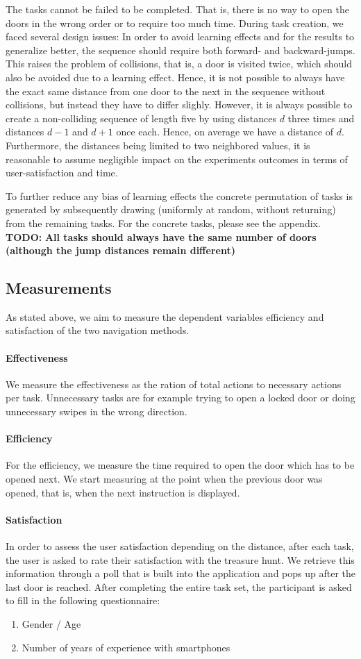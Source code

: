 \documentclass{sig-alternate-05-2015}
\newcommand{\todo}{\textbf{TODO:} \textbf}
\begin{document}
The tasks cannot be failed to be completed. That is, there is no way to open the doors in the wrong order or to require too much time.
During task creation, we faced several design issues: In order to avoid learning effects and for the results to generalize better, 
the sequence should require both forward- and backward-jumps. This raises the problem of collisions, that is, a door is visited twice, which
should also be avoided due to a learning effect. Hence, it is not possible to always have the exact same distance from one door to the
next in the sequence without collisions, but instead they have to differ slighly. However, it is always possible to create a non-colliding sequence of
length five by using distances $d$ three times and distances $d - 1$ and $d + 1$ once each. Hence, on average we have a distance of $d$. 
Furthermore, the distances being limited to two neighbored values, it is reasonable to assume negligible
impact on the experiments outcomes in terms of user-satisfaction and time.

To further reduce any bias of learning effects
the concrete permutation of tasks is generated by subsequently drawing
(uniformly at random, without returning) from the remaining tasks.
For the concrete tasks, please see the appendix.
\todo{All tasks should always have the same number of doors (although the jump distances remain different)}
\subsection{Measurements}
As stated above, we aim to measure the dependent variables efficiency and satisfaction of the two navigation methods.
\paragraph{Effectiveness}
We measure the effectiveness as the ration of total actions to necessary actions per task. Unnecessary tasks are for example trying to open a locked door or
doing unnecessary swipes in the wrong direction.
\paragraph{Efficiency} For the efficiency, we measure the time required to open the door which has to be opened next. We start measuring at the point
when the previous door was opened, that is, when the next instruction is displayed.
\paragraph{Satisfaction}
In order to assess the user satisfaction depending on the distance, after each task, the user is asked to rate their
satisfaction with the treasure hunt. We retrieve this information through a poll that is built into the application and pops
up after the last door is reached.
After completing the entire task set, the participant is asked to fill in the following questionnaire:
\begin{enumerate}
  \item Gender / Age
  \item Number of years of experience with smartphones
\end{enumerate}
\end{document}
